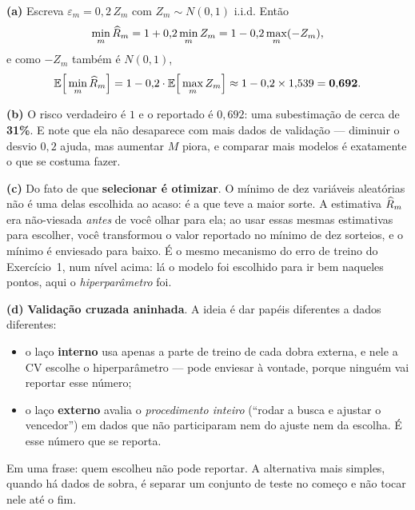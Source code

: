 \documentclass[11pt,a4paper]{article}
\begin{document}
\begin{solucao}
\textbf{(a)} Escreva $\varepsilon_m=0{,}2\,Z_m$ com $Z_m\sim N(0,1)$ i.i.d. Então
\[
  \min_m \widehat{R}_m = 1 + 0{,}2\min_m Z_m = 1 - 0{,}2\max_m(-Z_m),
\]
e como $-Z_m$ também é $N(0,1)$,
\[
  \mathbb{E}\Big[\min_m \widehat{R}_m\Big] = 1 - 0{,}2\cdot\mathbb{E}\Big[\max_m Z_m\Big]
  \approx 1 - 0{,}2\times 1{,}539 = \mathbf{0{,}692}.
\]

\smallskip
\textbf{(b)} O risco verdadeiro é $1$ e o reportado é $0{,}692$: uma subestimação
de cerca de \textbf{31\%}. E note que ela não desaparece com mais dados de
validação --- diminuir o desvio $0{,}2$ ajuda, mas aumentar $M$ piora, e comparar
mais modelos é exatamente o que se costuma fazer.

\smallskip
\textbf{(c)} Do fato de que \textbf{selecionar é otimizar}. O mínimo de dez
variáveis aleatórias não é uma delas escolhida ao acaso: é a que teve a maior
sorte. A estimativa $\widehat{R}_m$ era não-viesada \emph{antes} de você olhar para
ela; ao usar essas mesmas estimativas para escolher, você transformou o valor
reportado no mínimo de dez sorteios, e o mínimo é enviesado para baixo. É o
mesmo mecanismo do erro de treino do Exercício~1, num nível acima: lá o modelo
foi escolhido para ir bem naqueles pontos, aqui o \emph{hiperparâmetro} foi.

\smallskip
\textbf{(d)} \textbf{Validação cruzada aninhada}. A ideia é dar papéis
diferentes a dados diferentes:
\begin{itemize}[leftmargin=1.4cm]
  \item o laço \textbf{interno} usa apenas a parte de treino de cada dobra
        externa, e nele a CV escolhe o hiperparâmetro --- pode enviesar à
        vontade, porque ninguém vai reportar esse número;
  \item o laço \textbf{externo} avalia o \emph{procedimento inteiro} (``rodar a
        busca e ajustar o vencedor'') em dados que não participaram nem do
        ajuste nem da escolha. É esse número que se reporta.
\end{itemize}
Em uma frase: quem escolheu não pode reportar. A alternativa mais simples, quando
há dados de sobra, é separar um conjunto de teste no começo e não tocar nele até
o fim.
\end{solucao}
\end{document}
